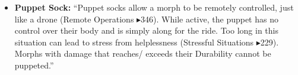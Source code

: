 \begin{itemize}
    \item \textbf{Puppet Sock:} “Puppet socks allow a morph to be remotely controlled, just like a drone (Remote Operations $\blacktriangleright$346). While active, the puppet has no control over their body and is simply along for the ride. Too long in this situation can lead to stress from helplessness (Stressful Situations $\blacktriangleright$229). Morphs with damage that reaches/ exceeds their Durability cannot be puppeted.” \citep[pg. 316]{ep2e_1.1_2019}
\end{itemize}